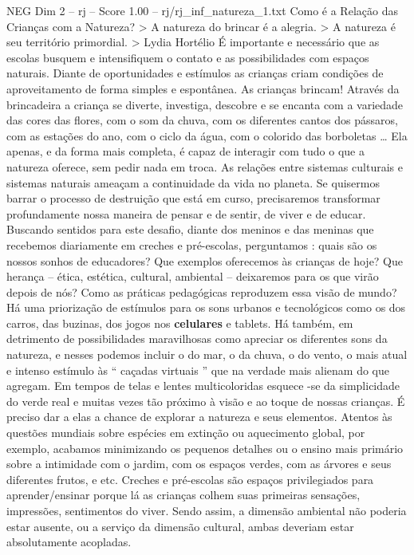 \begin{textsample}{NEG Dim 2 – rj – Score 1.00 – rj/rj\_inf\_natureza\_1.txt}  \label{ex:f2_neg_060}
Como é a Relação das Crianças com a Natureza? > A natureza do brincar é a alegria. > A natureza é seu território primordial. > Lydia Hortélio É importante e necessário que as escolas busquem e intensifiquem o contato e as possibilidades com espaços naturais.
Diante de oportunidades e estímulos as crianças criam condições de aproveitamento de forma simples e espontânea.
As crianças brincam!
Através da brincadeira a criança se diverte, investiga, descobre e se encanta com a variedade das cores das flores, com o som da chuva, com os diferentes cantos dos pássaros, com as estações do ano, com o ciclo da água, com o colorido das borboletas … Ela apenas, e da forma mais completa, é capaz de interagir com tudo o que a natureza oferece, sem pedir nada em troca.
As relações entre sistemas culturais e sistemas naturais ameaçam a continuidade da vida no planeta.
Se quisermos barrar o processo de destruição que está em curso, precisaremos transformar profundamente nossa maneira de pensar e de sentir, de viver e de educar.
Buscando sentidos para este desafio, diante dos meninos e das meninas que recebemos diariamente em creches e pré-escolas, perguntamos : quais são os nossos sonhos de educadores?
Que exemplos oferecemos às crianças de hoje?
Que herança – ética, estética, cultural, ambiental – deixaremos para os que virão depois de nós?
Como as práticas pedagógicas reproduzem essa visão de mundo?
Há uma priorização de estímulos para os sons urbanos e tecnológicos como os dos carros, das buzinas, dos jogos nos \textbf{celulares} e tablets.
Há também, em detrimento de possibilidades maravilhosas como apreciar os diferentes sons da natureza, e nesses podemos incluir o do mar, o da chuva, o do vento, o mais atual e intenso estímulo às “ caçadas virtuais ” que na verdade mais alienam do que agregam.
Em tempos de telas e lentes multicoloridas esquece -se da simplicidade do verde real e muitas vezes tão próximo à visão e ao toque de nossas crianças.
É preciso dar a elas a chance de explorar a natureza e seus elementos.
Atentos às questões mundiais sobre espécies em extinção ou aquecimento global, por exemplo, acabamos minimizando os pequenos detalhes ou o ensino mais primário sobre a intimidade com o jardim, com os espaços verdes, com as árvores e seus diferentes frutos, e etc.
Creches e pré-escolas são espaços privilegiados para aprender/ensinar porque lá as crianças colhem suas primeiras sensações, impressões, sentimentos do viver.
Sendo assim, a dimensão ambiental não poderia estar ausente, ou a serviço da dimensão cultural, ambas deveriam estar absolutamente acopladas.

\end{textsample}

